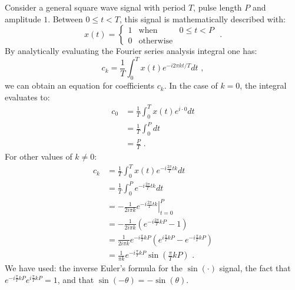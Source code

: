 Consider a general square wave signal with period $T$, pulse length $P$ and amplitude $1$. Between $0\le t < T$, this signal is mathematically described with:
\begin{equation}
x(t) = \left\{ \begin{array}{ccl}
1 & \mathrm{when} & 0 \le t < P \\
0 & \mathrm{otherwise} & 
\end{array}
\right. \,\,.
\end{equation}
By analytically evaluating the Fourier series analysis integral one has:
\begin{equation}
c_k = \frac{1}{T}\int_0^T x(t) e^{-i 2\pi k t/T} dt \,\,,
\end{equation}
we can obtain an equation for coefficients $c_k$. In the case of $k=0$, the integral evaluates to:
\begin{align}
c_0 & = \frac{1}{T}\int_0^{T} x(t) e^{i\cdot 0}dt\\
    & = \frac{1}{T}\int_0^{P}  dt \\
    & = \frac{P}{T} \,\,.\label{eq:pulsecoeff0}
\end{align}
For other values of $k\ne 0$:
\begin{align}
c_k & = \frac{1}{T}\int_0^{T} x(t) e^{-i\frac{2\pi}{T} t k}dt\\
 & =  \frac{1}{T}\int_0^{P}  e^{-i\frac{2\pi}{T} t k}dt \\
 & = \left.-\frac{1 }{2i \pi k}e^{-i\frac{2\pi}{T}  t k}\right\vert_{t=0}^{P} \\
 & = -\frac{1}{2i\pi k}\left(e^{-i\frac{2\pi}{T}  k P} - 1\right)\\
 & = \frac{1}{2i\pi k}e^{-i\frac{\pi}{T}  k P}\left(e^{i \frac{\pi}{T} kP} - e^{-i \frac{\pi}{T} kP} \right)\\
& =  \frac{1}{\pi k}e^{-i\frac{\pi}{T}  k P}\sin\left(\frac{\pi}{T} kP\right) \,\,.\label{eq:pulsecoeff1}
\end{align}
We have used: the inverse Euler's formula for the $\sin(\cdot)$ signal, the fact that $e^{-i\frac{\pi}{T} k P}e^{i\frac{\pi}{T} k P}=1$, and that $\sin(-\theta)=-\sin(\theta)$. 

